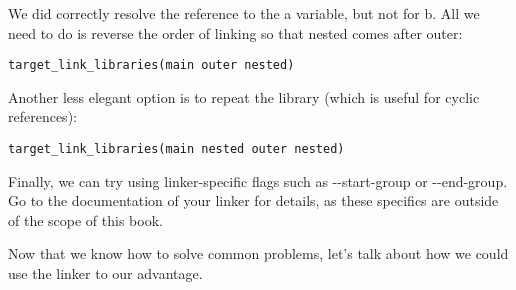 We did correctly resolve the reference to the a variable, but not for b. All we need to do is reverse the order of linking so that nested comes after outer:

\begin{lstlisting}[style=styleCMake]
target_link_libraries(main outer nested)
\end{lstlisting}

Another less elegant option is to repeat the library (which is useful for cyclic references):

\begin{lstlisting}[style=styleCMake]
target_link_libraries(main nested outer nested)
\end{lstlisting}

Finally, we can try using linker-specific flags such as -{}-start-group or -{}-end-group. Go to the documentation of your linker for details, as these specifics are outside of the scope of this book.

Now that we know how to solve common problems, let's talk about how we could use the linker to our advantage.











